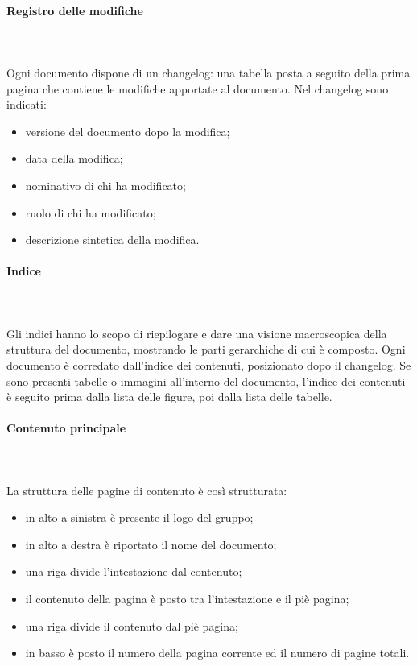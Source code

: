 		\paragraph{Registro delle modifiche} \mbox{}\\ \mbox{}\\
		Ogni documento dispone di un changelog\glo: una tabella posta a seguito della prima pagina che contiene le modifiche apportate al documento. Nel changelog sono indicati:
		\begin{itemize}
			\item versione del documento dopo la modifica;
			\item data della modifica;
			\item nominativo di chi ha modificato;
			\item ruolo di chi ha modificato;
			\item descrizione sintetica della modifica.
		\end{itemize}
		\paragraph{Indice} \mbox{}\\ \mbox{}\\
		Gli indici hanno lo scopo di riepilogare e dare una visione macroscopica della struttura del documento, mostrando le parti gerarchiche di cui è composto.\newline 
		Ogni documento è corredato dall'indice dei contenuti, posizionato dopo il changelog\glo. Se sono presenti tabelle o immagini all'interno del documento, l'indice dei contenuti è seguito prima dalla lista delle figure, poi dalla lista delle tabelle.
		\paragraph{Contenuto principale} \mbox{}\\ \mbox{}\\
		La struttura delle pagine di contenuto è così strutturata:
		\begin{itemize}
			\item in alto a sinistra è presente il logo del gruppo;
			\item in alto a destra è riportato il nome del documento;
			\item una riga divide l'intestazione dal contenuto;
			\item il contenuto della pagina è posto tra l'intestazione e il piè pagina;
			\item una riga divide il contenuto dal piè pagina;
			\item in basso è posto il numero della pagina corrente ed il numero di pagine totali.
		\end{itemize}
